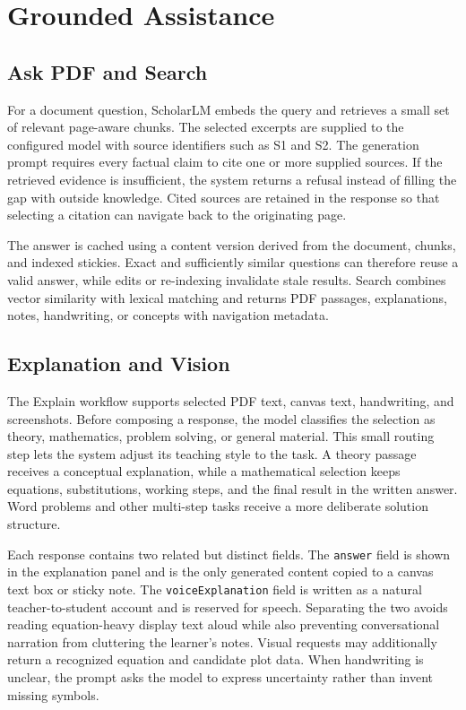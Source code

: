 \documentclass[conference]{IEEEtran}
\begin{document}
\section{Grounded Assistance}
\subsection{Ask PDF and Search}
For a document question, ScholarLM embeds the query and retrieves a small set of relevant page-aware chunks. The selected excerpts are supplied to the configured model with source identifiers such as S1 and S2. The generation prompt requires every factual claim to cite one or more supplied sources. If the retrieved evidence is insufficient, the system returns a refusal instead of filling the gap with outside knowledge. Cited sources are retained in the response so that selecting a citation can navigate back to the originating page.

The answer is cached using a content version derived from the document, chunks, and indexed stickies. Exact and sufficiently similar questions can therefore reuse a valid answer, while edits or re-indexing invalidate stale results. Search combines vector similarity with lexical matching and returns PDF passages, explanations, notes, handwriting, or concepts with navigation metadata.

\subsection{Explanation and Vision}
The Explain workflow supports selected PDF text, canvas text, handwriting, and screenshots. Before composing a response, the model classifies the selection as theory, mathematics, problem solving, or general material. This small routing step lets the system adjust its teaching style to the task. A theory passage receives a conceptual explanation, while a mathematical selection keeps equations, substitutions, working steps, and the final result in the written answer. Word problems and other multi-step tasks receive a more deliberate solution structure.

Each response contains two related but distinct fields. The \texttt{answer} field is shown in the explanation panel and is the only generated content copied to a canvas text box or sticky note. The \texttt{voiceExplanation} field is written as a natural teacher-to-student account and is reserved for speech. Separating the two avoids reading equation-heavy display text aloud while also preventing conversational narration from cluttering the learner's notes. Visual requests may additionally return a recognized equation and candidate plot data. When handwriting is unclear, the prompt asks the model to express uncertainty rather than invent missing symbols.
\end{document}
